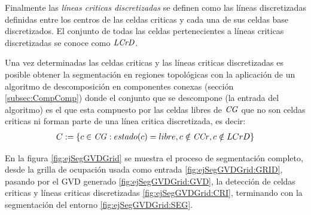 






Finalmente las \emph{líneas criticas discretizadas} se definen como las líneas
discretizadas \cite{foleyphillips} definidas entre los centros de las celdas
criticas y cada una de sus celdas base discretizados. El conjunto de todas las
celdas pertenecientes a líneas criticas discretizadas se conoce como
$\mathit{LCrD}$.

Una vez determinadas las celdas criticas y las líneas criticas discretizadas es
posible obtener la segmentación en regiones topológicas con la aplicación de un
algoritmo de descomposición en componentes conexas (sección
\ref{subsec:CompComp}) donde el conjunto que se descompone (la entrada del
algoritmo) es el que esta compuesto por las celdas libres de $\mathit{CG}$ que no son
celdas criticas ni forman parte de una línea critica discretizada, es decir: 
\begin{align*}
C := \{ c \in \mathit{CG} : estado(c) = libre, c \notin \mathit{CCr}, c \notin{LCrD}\}
\end{align*}

En la figura \ref{fig:ejSegGVDGrid} se muestra el proceso de segmentación
completo, desde la grilla de ocupación usada como entrada
\ref{fig:ejSegGVDGrid:GRID}, pasando por el GVD generado
\ref{fig:ejSegGVDGrid:GVD}, la detección de celdas criticas y líneas criticas discretizadas
\ref{fig:ejSegGVDGrid:CRI}, terminando con la segmentación del entorno
\ref{fig:ejSegGVDGrid:SEG}.

